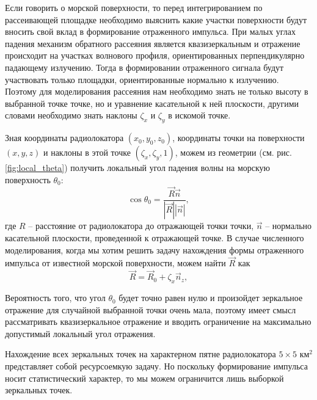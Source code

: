 Если говорить о морской поверхности, то перед интегрированием по рассеивающей
площадке необходимо выяснить какие участки поверхности будут вносить свой вклад
в формирование отраженного импульса.  При малых углах падения механизм обратного  рассеяния является квазизеркальным и отражение происходит на участках волнового профиля, ориентированных
перпендикулярно падающему излучению. Тогда в формировании отраженного сигнала
будут участвовать только площадки, ориентированные нормально к излучению. 
Поэтому для моделирования рассеяния нам необходимо знать не только высоту
в выбранной точке точке, но и уравнение касательной к ней плоскости, другими словами необходимо знать наклоны $\zeta_x$ и  $\zeta_y$ в искомой точке.


Зная координаты радиолокатора  $(x_0,y_0,z_0)$, координаты точки на
поверхности $(x,y,z)$ и наклоны в этой точке $(\zeta_x,\zeta_y,1)$, можем из
геометрии (см. рис. \ref{fig:local_theta}) получить локальный угол падения
волны на морскую поверхность $\theta_0$:
\begin{equation}
    \label{eq:local_theta}
    \cos \theta_0 =  \frac{\vec R \vec n}{|\vec R| |\vec n|}, 
\end{equation}
где $R$ -- расстояние от радиолокатора до отражающей точки точки,
 $\vec n$ -- нормально касательной плоскости, проведенной к отражающей точке.
 В случае численного моделирования, когда мы хотим решить задачу нахождения
 формы отраженного импульса от известной морской поверхности, можем найти
 $\vec R$ как
 \begin{equation}
     \label{eq:R_1}
     \vec R = \vec R_0 + \zeta_x \vec n_z,
 \end{equation}




Вероятность того, что угол $\theta_0$ будет точно равен нулю и произойдет
зеркальное отражение для случайной выбранной точки очень мала, поэтому имеет
смысл рассматривать квазизеркальное отражение и вводить ограничение на
максимально допустимый локальный угол отражения. 

Нахождение всех зеркальных точек на характерном пятне радиолокатора  $5\times
5 \text{ км}^2$ представляет собой ресурсоемкую задачу. Но поскольку формирование
импульса носит статистический характер, то мы можем ограничится лишь выборкой зеркальных точек. 





